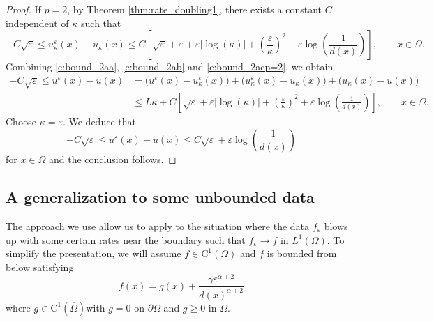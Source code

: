\documentclass[11pt,reqno]{amsart}
\numberwithin{figure}{section}
\theoremstyle{plain}
\newtheorem{thm}{Theorem}[section]
\theoremstyle{remark}
\numberwithin{equation}{section}
\newcommand{\R}{\mathbb{R}}
\begin{document}
\begin{proof}
\noindent If $p=2$, by Theorem \ref{thm:rate_doubling1}, there exists a constant $C$ independent of $\kappa$ such that
\begin{equation}\label{e:bound_2acp=2}
    -C\sqrt{\varepsilon}\leq u^\varepsilon_\kappa(x) - u_\kappa(x) \leq C\left[\sqrt{\varepsilon} + \varepsilon + \varepsilon |\log(\kappa)|+\left(\frac{\varepsilon}{\kappa}\right)^2 + \varepsilon\log\left(\frac{1}{d(x)}\right)\right], \qquad x\in \Omega.
\end{equation}
Combining \eqref{e:bound_2aa}, \eqref{e:bound_2ab} and \eqref{e:bound_2acp=2}, we obtain
\begin{equation*}
\begin{split}
   -C\sqrt{\varepsilon}\leq u^\varepsilon(x) - u(x) &= \Big(u^\varepsilon(x) - u^\varepsilon_\kappa(x)\Big) + \Big(u^\varepsilon_\kappa(x) - u_\kappa(x)\Big) + \Big(u_\kappa(x) - u(x)\Big) \\
    &\leq L\kappa + C\left[\sqrt{\varepsilon} + \varepsilon|\log(\kappa)| + \left(\frac{\varepsilon}{\kappa}\right)^{2} + \varepsilon\log\left(\frac{1}{d(x)}\right) \right], \qquad x\in \Omega.
\end{split}
\end{equation*}
Choose $\kappa = \varepsilon$. We deduce that
\begin{equation*}
    -C\sqrt{\varepsilon}\leq u^\varepsilon(x) - u(x) \leq C\sqrt{\varepsilon} +\varepsilon\log\left(\frac{1}{d(x)}\right)
\end{equation*}
for $x\in \Omega$ and the conclusion follows. 
\end{proof}

\subsection{A generalization to some unbounded data} The approach we use allow us to apply to the situation where the data $f_\varepsilon$ blows up with some certain rates near the boundary such that $f_\varepsilon\to f$ in $L^1(\Omega)$. To simplify the presentation, we will assume $f\in \mathrm{C}^1(\Omega)$ and $f$ is bounded from below satisfying 
\begin{equation*}
    f(x) = g(x) + \frac{\gamma \varepsilon^{\alpha+2}}{d(x)^{\alpha+2}}
\end{equation*}
where $g\in \mathrm{C}^1(\overline{\Omega})$with $g = 0$ on $\partial\Omega$ and $g\geq 0$ in $\Omega$.

\end{document}
